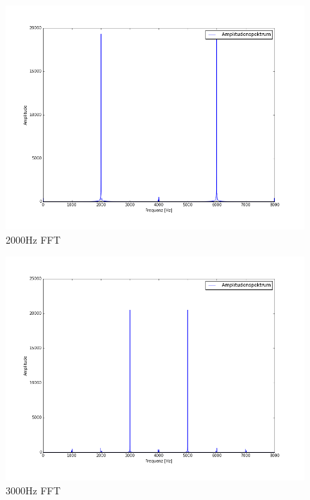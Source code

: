 \documentclass[12pt,oneside,a4paper]{report}
\begin{document}
\begin{figure}[H]
\centering\small
\includegraphics[scale=0.4]{src/2000fft.png}
\caption{2000Hz FFT}
\label{fig:2000_FFT}
\end{figure}

\begin{figure}[H]
\centering\small
\includegraphics[scale=0.4]{src/3000fft.png}
\caption{3000Hz FFT}
\label{fig:3000_FFT}
\end{figure}
\end{document}
